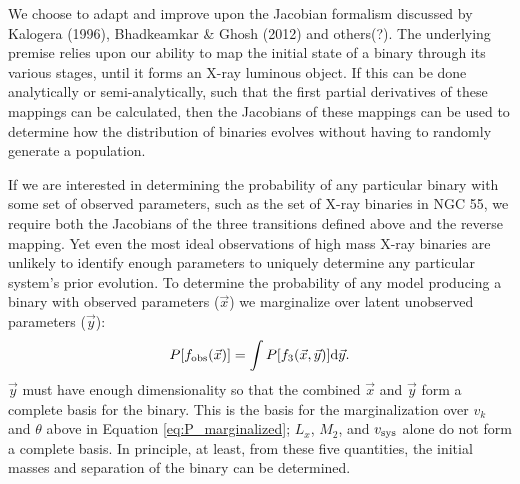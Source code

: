 \documentclass[12pt, preprint]{aastex}
\newcommand{\dd}{\mathrm{d}}
\begin{document}

We choose to adapt and improve upon the Jacobian formalism discussed by Kalogera (1996), Bhadkeamkar \& Ghosh (2012) and others(?). The underlying premise relies upon our ability to map the initial state of a binary through its various stages, until it forms an X-ray luminous object. If this can be done analytically or semi-analytically, such that the first partial derivatives of these mappings can be calculated, then the Jacobians of these mappings can be used to determine how the distribution of binaries evolves without having to randomly generate a population.

If we are interested in determining the probability of any particular binary with some set of observed parameters, such as the set of X-ray binaries in NGC 55, we require both the Jacobians of the three transitions defined above and the reverse mapping. Yet even the most ideal observations of high mass X-ray binaries are unlikely to identify enough parameters to uniquely determine any particular system's prior evolution. To determine the probability of any model producing a binary with observed parameters ($\vec{x}$) we marginalize over latent unobserved parameters ($\vec{y}$):
\begin{equation}
P[f_{\rm obs}(\vec{x})] = \int P[f_3(\vec{x}, \vec{y})] \dd \vec{y}.
\end{equation}
$\vec{y}$ must have enough dimensionality so that the combined $\vec{x}$ and $\vec{y}$ form a complete basis for the binary. This is the basis for the marginalization over $v_k$ and $\theta$ above in Equation \ref{eq:P_marginalized}; $L_x$, $M_2$, and $v_{\rm sys}$ alone do not form a complete basis. In principle, at least, from these five quantities, the initial masses and separation of the binary can be determined.
\end{document}

